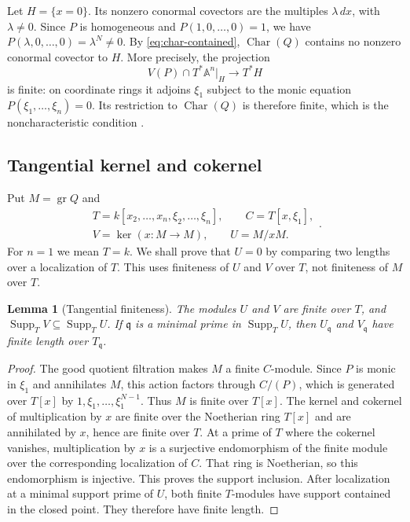 \documentclass[11pt]{amsart}
\newtheorem{lemma}[theorem]{Lemma}
\theoremstyle{definition}
\newcommand{\CharVar}{\operatorname{Char}}
\begin{document}
Let $H=\{x=0\}$. Its nonzero conormal covectors are the multiples
$\lambda\,dx$, with $\lambda\ne0$. Since $P$ is homogeneous and
$P(1,0,\ldots,0)=1$, we have
$P(\lambda,0,\ldots,0)=\lambda^N\ne0$. By \eqref{eq:char-contained},
$\CharVar(Q)$ contains no nonzero conormal covector to $H$. More precisely,
the projection
\[
 V(P)\cap T^*\mathbb A^n|_H\longrightarrow T^*H
\]
is finite: on coordinate rings it adjoins $\xi_1$ subject to the monic
equation $P(\xi_1,\ldots,\xi_n)=0$. Its restriction to $\CharVar(Q)$ is
therefore finite, which is the noncharacteristic condition
\cite[Definition~15.6]{SchnellNotes}.

\subsection{Tangential kernel and cokernel}

Put $M=\operatorname{gr}Q$ and
\[
 \begin{gathered}
 T=k[x_2,\ldots,x_n,\xi_2,\ldots,\xi_n],\qquad C=T[x,\xi_1],\\
 V=\ker(x:M\to M),\qquad U=M/xM.
 \end{gathered}.
\]
For $n=1$ we mean $T=k$. We shall prove that $U=0$ by comparing
two lengths over a localization of $T$. This uses finiteness of $U$ and $V$
over $T$, not finiteness of $M$ over $T$.

\begin{lemma}[Tangential finiteness]\label{lem:tangential-finiteness}
The modules $U$ and $V$ are finite over $T$, and
$\operatorname{Supp}_T V\subseteq\operatorname{Supp}_T U$.
If $\mathfrak q$ is a minimal prime in $\operatorname{Supp}_T U$, then
$U_{\mathfrak q}$ and $V_{\mathfrak q}$ have finite length over
$T_{\mathfrak q}$.
\end{lemma}
\begin{proof}
The good quotient filtration makes $M$ a finite $C$-module.
Since $P$ is monic in $\xi_1$ and annihilates $M$, this action factors
through $C/(P)$, which is generated over $T[x]$ by
$1,\xi_1,\ldots,\xi_1^{N-1}$. Thus $M$ is finite over $T[x]$.
The kernel and cokernel of multiplication by $x$ are finite over the
Noetherian ring $T[x]$ and are annihilated by $x$, hence are finite over $T$.
At a prime of $T$ where the cokernel vanishes, multiplication by $x$ is a
surjective endomorphism of the finite module over the corresponding
localization of $C$. That ring is Noetherian, so this endomorphism is
injective. This proves the support inclusion.
After localization at a minimal support prime of $U$, both finite
$T$-modules have support contained in the closed point. They therefore have
finite length.
\end{proof}
\end{document}
